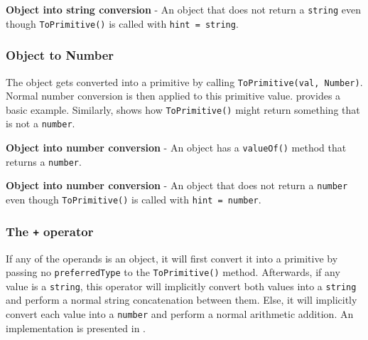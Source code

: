 \begin{code}
	\captionsetup{aboveskip=0pt, belowskip=10pt}
	\caption[Object into string conversion]{\textbf{Object into string conversion} - An object that does not return a \texttt{string} even though \texttt{ToPrimitive()} is called with \texttt{hint = string}.}
	\label{code:background-object-into-string-not-string-return-value}
\end{code}

\subsubsection{Object to Number}
The object gets converted into a primitive by calling \texttt{ToPrimitive(val, Number)}. Normal number conversion is then applied to this primitive value.  provides a basic example. Similarly,  shows how \texttt{ToPrimitive()} might return something that is not a \texttt{number}.

\begin{code}
	\captionsetup{aboveskip=0pt, belowskip=10pt}
	\caption[Object into number conversion]{\textbf{Object into number conversion} - An object has a \texttt{valueOf()} method that returns a \texttt{number}.}
	\label{code:background-object-into-number}
\end{code}

\begin{code}
	\captionsetup{aboveskip=0pt, belowskip=10pt}
	\caption[Object into number conversion]{\textbf{Object into number conversion} - An object that does not return a \texttt{number} even though \texttt{ToPrimitive()} is called with \texttt{hint = number}.}
	\label{code:background-object-into-string-not-number-return-value}
\end{code}

\subsubsection{The \texttt{+} operator}
If any of the operands is an object, it will first convert it into a primitive by passing no \texttt{preferredType} to the \texttt{ToPrimitive()} method. Afterwards, if any value is a \texttt{string}, this operator will implicitly convert both values into a \texttt{string} and perform a normal string concatenation between them. Else, it will implicitly convert each value into a \texttt{number} and perform a normal arithmetic addition. An implementation is presented in .

